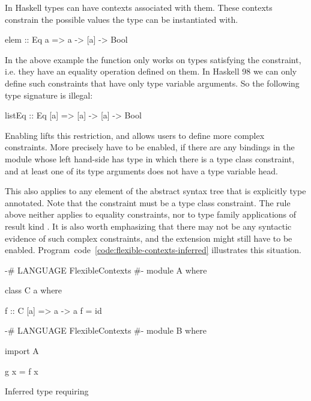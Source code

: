\documentclass[main.tex]{subfiles}
\begin{document}
	
	In Haskell types can have contexts associated with them. These contexts constrain the possible values the type can be instantiated with.
	
	\begin{oneLineHaskell}
		elem :: Eq a => a -> [a] -> Bool
	\end{oneLineHaskell}
	
	In the above example the function  only works on types satisfying the  constraint, i.e. they have an equality operation defined on them. In Haskell 98 we can only define such constraints that have only type variable arguments. So the following type signature is illegal:
	
	\begin{oneLineHaskell}
		listEq :: Eq [a] => [a] -> [a] -> Bool
	\end{oneLineHaskell}
	
	Enabling  lifts this restriction, and allows users to define more complex constraints. More precisely  have to be enabled, if there are any bindings in the module whose left hand-side has type in which there is a type class constraint, and at least one of its type arguments does not have a type variable head. 
	
	This also applies to any element of the abstract syntax tree that is explicitly type annotated. Note that the constraint must be a type class constraint. The rule above neither applies to equality constraints, nor to type family applications of result kind . It is also worth emphasizing that there may not be any syntactic evidence of such complex constraints, and the extension might still have to be enabled. Program~code~\ref{code:flexible-contexts-inferred} illustrates this situation.
	
	\begin{codeFloat}
		\noindent
		\begin{minipage}{0.47\textwidth}
			\begin{haskell}
				{-# LANGUAGE FlexibleContexts #-}
				module A where
				
				class C a where
				
				f :: C [a] => a -> a
				f = id
			\end{haskell}
		\end{minipage}
		\hfill
		\begin{minipage}{0.50\textwidth}
			\begin{haskell}	
				{-# LANGUAGE FlexibleContexts #-}
				module B where	
					
				import A
								
				
				g x = f x
			\end{haskell}
		\end{minipage}
		\caption{Inferred type requiring }
		\label{code:flexible-contexts-inferred}
	\end{codeFloat}
\end{document}
